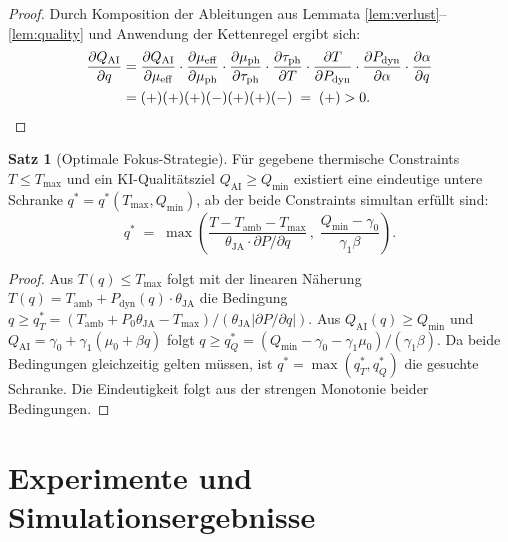 ﻿\documentclass[a4paper,12pt]{article}
\theoremstyle{definition}
\newtheorem{satz}{Satz}
\begin{document}
\begin{proof}
Durch Komposition der Ableitungen aus Lemmata \ref{lem:verlust}--\ref{lem:quality} und
Anwendung der Kettenregel ergibt sich:
\begin{align*}
\frac{\partial Q_{\mathrm{AI}}}{\partial q}
&= \frac{\partial Q_{\mathrm{AI}}}{\partial \mu_{\mathrm{eff}}}
   \cdot \frac{\partial \mu_{\mathrm{eff}}}{\partial \mu_{\mathrm{ph}}}
   \cdot \frac{\partial \mu_{\mathrm{ph}}}{\partial \tau_{\mathrm{ph}}}
   \cdot \frac{\partial \tau_{\mathrm{ph}}}{\partial T}
   \cdot \frac{\partial T}{\partial P_{\mathrm{dyn}}}
   \cdot \frac{\partial P_{\mathrm{dyn}}}{\partial \alpha}
   \cdot \frac{\partial \alpha}{\partial q} \\
&= (+)(+)(+)(-)(+)(+)(-) \;=\; (+) > 0. \qedhere
\end{align*}
\end{proof}

\begin{satz}[Optimale Fokus-Strategie]
\label{satz:optimal}
Für gegebene thermische Constraints $T \leq T_{\max}$ und ein KI-Qualitätsziel
$Q_{\mathrm{AI}} \geq Q_{\min}$ existiert eine eindeutige untere Schranke
$q^* = q^*(T_{\max}, Q_{\min})$, ab der beide Constraints simultan erfüllt sind:
\[
q^* \;=\; \max\!\left(
\frac{T - T_{\mathrm{amb}} - T_{\max}}{\theta_{\mathrm{JA}} \cdot \partial P/\partial q}\,, \;
\frac{Q_{\min} - \gamma_0}{\gamma_1 \beta}
\right).
\]
\end{satz}

\begin{proof}
Aus $T(q) \leq T_{\max}$ folgt mit der linearen Näherung
$T(q) = T_{\mathrm{amb}} + P_{\mathrm{dyn}}(q) \cdot \theta_{\mathrm{JA}}$ die Bedingung
$q \geq q_T^* = (T_{\mathrm{amb}} + P_0 \theta_{\mathrm{JA}} - T_{\max}) / (\theta_{\mathrm{JA}} |\partial P/\partial q|)$.
Aus $Q_{\mathrm{AI}}(q) \geq Q_{\min}$ und $Q_{\mathrm{AI}} = \gamma_0 + \gamma_1(\mu_0 + \beta q)$
folgt $q \geq q_Q^* = (Q_{\min} - \gamma_0 - \gamma_1 \mu_0)/(\gamma_1 \beta)$.
Da beide Bedingungen gleichzeitig gelten müssen, ist $q^* = \max(q_T^*, q_Q^*)$ die
gesuchte Schranke. Die Eindeutigkeit folgt aus der strengen Monotonie beider Bedingungen. \qedhere
\end{proof}

\section{Experimente und Simulationsergebnisse}
\end{document}
